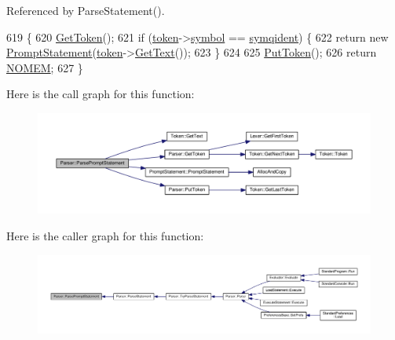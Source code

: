 Referenced by Parse\+Statement().


\begin{DoxyCode}
619 \{
620     \hyperlink{classParser_a415a103e66558b4d366d9a1420561fe3}{GetToken}();
621     \textcolor{keywordflow}{if} (\hyperlink{classParser_a467028559d31c5b33f16ca8be56715cc}{token}->\hyperlink{structToken_aa671eaaae5632c5277e89a090d864820}{symbol} == \hyperlink{lex_8h_a7feef761cd73fac6e25b8bb80d2c4e54a9a4f2a8a367485e87d9faf675bec17af}{symqident}) \{
622         \textcolor{keywordflow}{return} \textcolor{keyword}{new} \hyperlink{classPromptStatement}{PromptStatement}(\hyperlink{classParser_a467028559d31c5b33f16ca8be56715cc}{token}->\hyperlink{structToken_a15f1043de07ce8e452fbf115b85def71}{GetText}());
623     \}
624 
625     \hyperlink{classParser_adb5c3a188b36f7ecb198ae30f06338b3}{PutToken}();
626     \textcolor{keywordflow}{return} \hyperlink{platform_8h_a46ff2bfbf0d44b8466a2251d5bd5e6f8}{NOMEM};
627 \}
\end{DoxyCode}


Here is the call graph for this function\+:
\nopagebreak
\begin{figure}[H]
\begin{center}
\leavevmode
\includegraphics[width=350pt]{d0/d40/classParser_a3ff34c9305bf6b5f10aacf27e5d20c28_cgraph}
\end{center}
\end{figure}




Here is the caller graph for this function\+:
\nopagebreak
\begin{figure}[H]
\begin{center}
\leavevmode
\includegraphics[width=350pt]{d0/d40/classParser_a3ff34c9305bf6b5f10aacf27e5d20c28_icgraph}
\end{center}
\end{figure}


